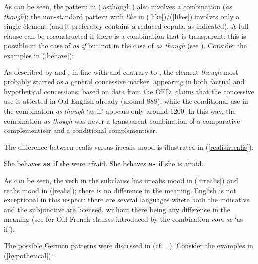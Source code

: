 \ea 
{}
\z
\z

As can be seen, the pattern in (\ref{asthough}) also involves a combination (\textit{as though}); the non-standard pattern with \textit{like} in (\ref{like})/(\ref{likes}) involves only a single element (and it preferably contains a reduced copula, as indicated). A full clause can be reconstructed if there is a combination that is transparent: this is possible in the case of \textit{as if} but not in the case of \textit{as though} (see ). Consider the examples in (\ref{behave}):

\ea \label{behave}
\z
\z

As described by \citet[388]{rudolph1996} and \citet[104]{chen2000}, in line with \citet{quirk1954} and contrary to \citet{koenig1985}, the element \textit{though} most probably started as a general concessive marker, appearing in both factual and hypothetical concessions: based on data from the OED, \citet[104]{chen2000} claims that the concessive use is attested in Old English already (around 888), while the conditional use in the combination \textit{as though} `as if' appears only around 1200. In this way, the combination \textit{as though} was never a transparent combination of a comparative complementiser and a conditional complementiser.

The difference between realis versus irrealis mood is illustrated in (\ref{realisirrealis}):

\ea \label{realisirrealis}
\ea She behaves \textbf{as if} she were afraid. \label{irrealis}
\ex	She behaves \textbf{as if} she is afraid. \label{realis}
\z
\z

As can be seen, the verb in the subclause has irrealis mood in (\ref{irrealis}) and realis mood in (\ref{realis}); there is no difference in the meaning. English is not exceptional in this respect: there are several languages where both the indicative and the subjunctive are licensed, without there being any difference in the meaning (see \citealt[393--394]{jensen1990} for Old French clauses introduced by the combination \textit{com se} `as if').

The possible German patterns were discussed in  (cf. \citealt{jaeger2010}, \citealt{eggs2006}). Consider the examples in (\ref{hypothetical}):\largerpage

